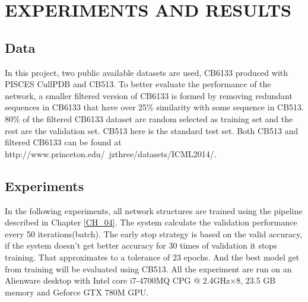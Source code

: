 \chapter{EXPERIMENTS AND RESULTS}
	\label{CH_05}
\section{Data}
In this project, two public available datasets are used, CB6133 produced with PISCES CullPDB\cite{wang2003pisces} and CB513. To better evaluate the performance of the network, a smaller filtered version of CB6133 is formed by removing redundant sequences in CB6133 that have over 25\% similarity with some sequence in CB513. 80\% of the filtered CB6133 dataset are random selected as training set and the rest are the validation set. CB513 here is the standard test set.
Both CB513 and filtered CB6133 can be found at http://www.princeton.edu/~jzthree/datasets/ICML2014/.
\section{Experiments}
In the following experiments, all network structures are trained using the pipeline described in Chapter \ref{CH_04}. The system calculate the validation performance every 50 iterations(batch). The early stop strategy is based on the valid accuracy, if the system doesn't get better accuracy for 30 times of validation it stops training. That approximates to a tolerance of 23 epochs. And the best model get from training will be evaluated using CB513. 
All the experiment are run on an Alienware desktop with Intel core i7-4700MQ CPG @ 2.4GHz×8, 23.5 GB memory and Geforce GTX 780M GPU.

